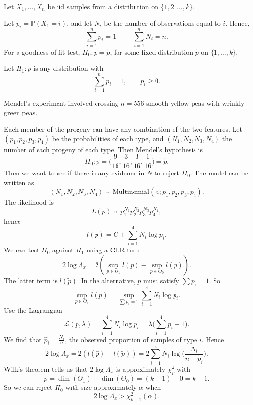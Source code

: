 \documentclass[12pt]{article}
\begin{document}
Let $X_1, \ldots, X_n$ be iid samples from a distribution on $\{1, 2, \ldots, k\}$.

Let $p_i = \mathbb{P}(X_1 = i)$, and let $N_i$ be the number of observations equal to $i$. Hence,
\[
\sum_{i = 1}^{n} p_i = 1, \qquad \sum_{i = 1}^{n} N_i = n.
\]
For a goodness-of-fit test, $H_0 : p = \tilde p$, for some fixed distribution $\tilde p$ on $\{1, \ldots, k\}$.

Let $H_1 : p$ is any distribution with
\[
\sum_{i = 1}^{n} p_i = 1, \qquad p_i \geq 0.
\]
\begin{exbox}
	Mendel's experiment involved crossing $n = 556$ smooth yellow peas with wrinkly green peas.

	Each member of the progeny can have any combination of the two features. Let $(p_1, p_2, p_3, p_4)$ be the probabilities of each type, and $(N_1, N_2, N_3, N_4)$ the number of each progeny of each type. Then Mendel's hypothesis is
	\[
	H_0 : p = \biggl( \frac{9}{16}, \frac{3}{16}, \frac{3}{16}, \frac{1}{16} \biggr) = \tilde p.
	\]
	Then we want to see if there is any evidence in $N$ to reject $H_0$. The model can be written as
	\[
		(N_1, N_2, N_3, N_4) \sim \mathrm{Multinomial}(n;p_1, p_2, p_3, p_4).
	\]
	The likelihood is
	\[
	L(p) \propto p_1^{N_1} p_2^{N_2} p_3^{N_3} p_4^{N_4},
	\]
	hence
	\[
	l(p) = C + \sum_{i=1}^{4} N_i \log p_i.
	\]
	We can test $H_0$ against $H_1$ using a GLR test:
	\[
	2 \log \Lambda_x = 2 ( \sup_{p \in \Theta_1} l(p) - \sup_{p \in \Theta_0}l(p)).
	\]
	The latter term is $l(\tilde p)$. In the alternative, $p$ must satisfy $\sum p_i = 1$. So
	\[
	\sup_{p \in \Theta_1} l(p) = \sup_{\sum p_i = 1} \sum_{i = 1}^{4} N_i \log p_i.
	\]
	Use the Lagrangian
	\[
	\mathcal{L}(p, \lambda) = \sum_{i=1}^{4} N_i \log p_i = \lambda\biggl( \sum_{i = 1}^{4} p_i - 1 \biggr).
	\]
	We find that $\hat p_i = \frac{N_i}{n}$, the observed proportion of samples of type $i$. Hence
	\[
	2 \log \Lambda_x = 2 (l(\hat p) - l(\tilde p)) = 2 \sum_{i = 1}^{4} N_i \log \biggl( \frac{N_i}{n - \tilde p_i} \biggr).
	\]
	Wilk's theorem tells us that $2 \log \Lambda_x$ is approximately $\chi_p^2$ with
	\[
	p = \dim(\Theta_1) - \dim(\Theta_0) = (k-1) - 0 = k-1.
	\]
	So we can reject $H_0$ with size approximately $\alpha$ when
	\[
	2 \log \Lambda_x > \chi_{k-1}^2(\alpha).
	\]
\end{exbox}


\newpage

\printindex
\end{document}
